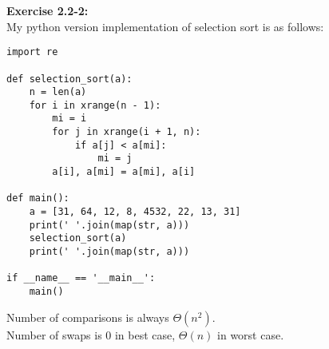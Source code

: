 \documentclass{article}
\begin{document}
\noindent
\textbf{Exercise 2.2-2:}\\
My python version implementation of selection sort is as follows:\\
\begin{verbatim}
import re

def selection_sort(a):
    n = len(a)
    for i in xrange(n - 1):
        mi = i
        for j in xrange(i + 1, n):
            if a[j] < a[mi]:
                mi = j
        a[i], a[mi] = a[mi], a[i]

def main():
    a = [31, 64, 12, 8, 4532, 22, 13, 31]
    print(' '.join(map(str, a)))
    selection_sort(a)
    print(' '.join(map(str, a)))

if __name__ == '__main__':
    main()
\end{verbatim}
\begin{spacing}{2.0}
\noindent
Number of comparisons is always $\Theta(n ^ 2).$\\
Number of swaps is 0 in best case, $\Theta(n)$ in worst case.\\
\end{spacing}
\end{document}
